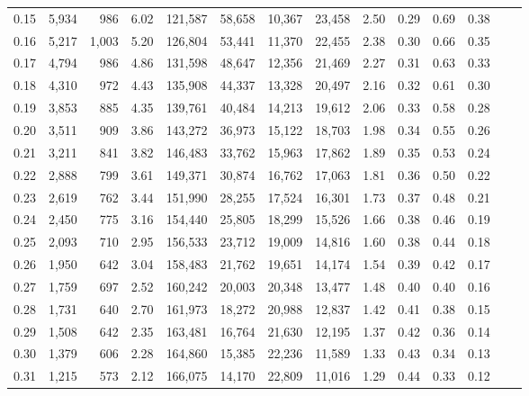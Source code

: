 \begin{tabular}{rrrrrrrrrrrrrr}
0.15 &   5,934 &    986 &    6.02 &  121,587 &   58,658 &  10,367 &  23,458 &  2.50 &  0.29 &  0.69 &      0.38 \\
0.16 &   5,217 &  1,003 &    5.20 &  126,804 &   53,441 &  11,370 &  22,455 &  2.38 &  0.30 &  0.66 &      0.35 \\
0.17 &   4,794 &    986 &    4.86 &  131,598 &   48,647 &  12,356 &  21,469 &  2.27 &  0.31 &  0.63 &      0.33 \\
0.18 &   4,310 &    972 &    4.43 &  135,908 &   44,337 &  13,328 &  20,497 &  2.16 &  0.32 &  0.61 &      0.30 \\
0.19 &   3,853 &    885 &    4.35 &  139,761 &   40,484 &  14,213 &  19,612 &  2.06 &  0.33 &  0.58 &      0.28 \\
0.20 &   3,511 &    909 &    3.86 &  143,272 &   36,973 &  15,122 &  18,703 &  1.98 &  0.34 &  0.55 &      0.26 \\
0.21 &   3,211 &    841 &    3.82 &  146,483 &   33,762 &  15,963 &  17,862 &  1.89 &  0.35 &  0.53 &      0.24 \\
0.22 &   2,888 &    799 &    3.61 &  149,371 &   30,874 &  16,762 &  17,063 &  1.81 &  0.36 &  0.50 &      0.22 \\
0.23 &   2,619 &    762 &    3.44 &  151,990 &   28,255 &  17,524 &  16,301 &  1.73 &  0.37 &  0.48 &      0.21 \\
0.24 &   2,450 &    775 &    3.16 &  154,440 &   25,805 &  18,299 &  15,526 &  1.66 &  0.38 &  0.46 &      0.19 \\
0.25 &   2,093 &    710 &    2.95 &  156,533 &   23,712 &  19,009 &  14,816 &  1.60 &  0.38 &  0.44 &      0.18 \\
0.26 &   1,950 &    642 &    3.04 &  158,483 &   21,762 &  19,651 &  14,174 &  1.54 &  0.39 &  0.42 &      0.17 \\
0.27 &   1,759 &    697 &    2.52 &  160,242 &   20,003 &  20,348 &  13,477 &  1.48 &  0.40 &  0.40 &      0.16 \\
0.28 &   1,731 &    640 &    2.70 &  161,973 &   18,272 &  20,988 &  12,837 &  1.42 &  0.41 &  0.38 &      0.15 \\
0.29 &   1,508 &    642 &    2.35 &  163,481 &   16,764 &  21,630 &  12,195 &  1.37 &  0.42 &  0.36 &      0.14 \\
0.30 &   1,379 &    606 &    2.28 &  164,860 &   15,385 &  22,236 &  11,589 &  1.33 &  0.43 &  0.34 &      0.13 \\
0.31 &   1,215 &    573 &    2.12 &  166,075 &   14,170 &  22,809 &  11,016 &  1.29 &  0.44 &  0.33 &      0.12 \\

\end{tabular}
